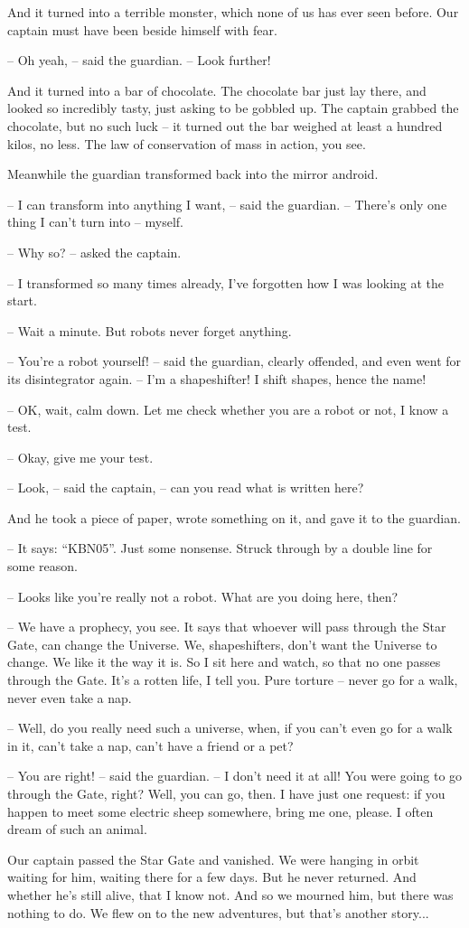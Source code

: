 \documentclass[ebook,oneside,final,openright]{memoir}
\begin{document}
And it turned into a terrible monster, which none of us has ever seen before. Our captain must have been beside himself with fear.\par
– Oh yeah, – said the guardian. – Look further!\par
\par
And it turned into a bar of chocolate. The chocolate bar just lay there, and looked so incredibly tasty, just asking to be gobbled up. The captain grabbed the chocolate, but no such luck – it turned out the bar weighed at least a hundred kilos, no less. The law of conservation of mass in action, you see.\par
\par
Meanwhile the guardian transformed back into the mirror android.\par
– I can transform into anything I want, – said the guardian. – There’s only one thing I can’t turn into – myself.\par
– Why so? – asked the captain.\par
– I transformed so many times already, I’ve forgotten how I was looking at the start.\par
– Wait a minute. But robots never forget anything.\par
– You’re a robot yourself! – said the guardian, clearly offended, and even went for its disintegrator again. – I’m a shapeshifter! I shift shapes, hence the name!\par
– OK, wait, calm down. Let me check whether you are a robot or not, I know a test.\par
– Okay, give me your test.\par
– Look, – said the captain, – can you read what is written here?\par
And he took a piece of paper, wrote something on it, and gave it to the guardian.\par
– It says: “KBN05”. Just some nonsense. Struck through by a double line for some reason.\par
– Looks like you’re really not a robot. What are you doing here, then?\par
– We have a prophecy, you see. It says that whoever will pass through the Star Gate, can change the Universe. We, shapeshifters, don’t want the Universe to change. We like it the way it is. So I sit here and watch, so that no one passes through the Gate. It’s a rotten life, I tell you. Pure torture – never go for a walk, never even take a nap.\par
– Well, do you really need such a universe, when, if you can’t even go for a walk in it, can’t take a nap, can’t have a friend or a pet?\par
– You are right! – said the guardian. – I don’t need it at all! You were going to go through the Gate, right? Well, you can go, then. I have just one request: if you happen to meet some electric sheep somewhere, bring me one, please. I often dream of such an animal.\par
Our captain passed the Star Gate and vanished. We were hanging in orbit waiting for him, waiting there for a few days. But he never returned. And whether he’s still alive, that I know not. And so we mourned him, but there was nothing to do. We flew on to the new adventures, but that’s another story...
\end{document}
